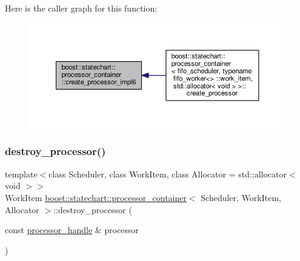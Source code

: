 Here is the caller graph for this function\+:
\nopagebreak
\begin{figure}[H]
\begin{center}
\leavevmode
\includegraphics[width=350pt]{classboost_1_1statechart_1_1processor__container_a14c516cb9fc15473920d5a5d79ee95db_icgraph}
\end{center}
\end{figure}
\mbox{\label{classboost_1_1statechart_1_1processor__container_aa6a671334e57fdb6b99946907c292cb6}} 
\subsubsection{\texorpdfstring{destroy\+\_\+processor()}{destroy\_processor()}}
{\footnotesize\ttfamily template$<$class Scheduler, class Work\+Item, class Allocator = std\+::allocator$<$ void $>$$>$ \\
Work\+Item \mbox{\hyperlink{classboost_1_1statechart_1_1processor__container}{boost\+::statechart\+::processor\+\_\+container}}$<$ Scheduler, Work\+Item, Allocator $>$\+::destroy\+\_\+processor (\begin{DoxyParamCaption}\item[{const \mbox{\hyperlink{classboost_1_1statechart_1_1processor__container_a82ebbffaed81d7b99119ae0e892f6411}{processor\+\_\+handle}} \&}]{processor }\end{DoxyParamCaption})\hspace{0.3cm}{\ttfamily [inline]}}

